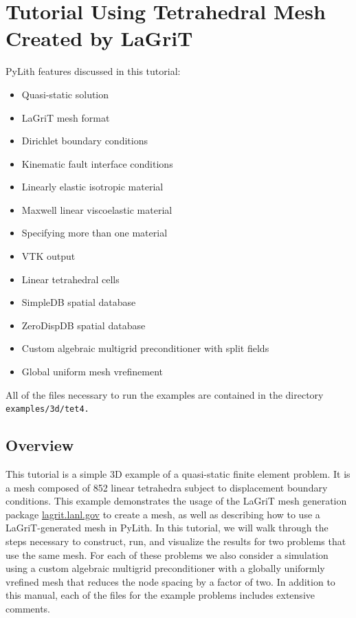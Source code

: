 
\section{\label{sec:Tutorial-3d-tet4}Tutorial Using Tetrahedral Mesh Created
by LaGriT}

PyLith features discussed in this tutorial:
\begin{itemize}
\item Quasi-static solution
\item LaGriT mesh format
\item Dirichlet boundary conditions
\item Kinematic fault interface conditions
\item Linearly elastic isotropic material
\item Maxwell linear viscoelastic material
\item Specifying more than one material
\item VTK output
\item Linear tetrahedral cells
\item SimpleDB spatial database
\item ZeroDispDB spatial database
\item Custom algebraic multigrid preconditioner with split fields
\item Global uniform mesh vrefinement
\end{itemize}
All of the files necessary to run the examples are contained in the
directory \texttt{examples/3d/tet4.}


\subsection{Overview}

This tutorial is a simple 3D example of a quasi-static finite element
problem. It is a mesh composed of 852 linear tetrahedra subject to
displacement boundary conditions. This example demonstrates the usage
of the LaGriT mesh generation package \url{lagrit.lanl.gov} to create
a mesh, as well as describing how to use a LaGriT-generated mesh in
PyLith. In this tutorial, we will walk through the steps necessary
to construct, run, and visualize the results for two problems that
use the same mesh. For each of these problems we also consider a simulation
using a custom algebraic multigrid preconditioner with a globally
uniformly vrefined mesh that reduces the node spacing by a factor of
two. In addition to this manual, each of the files for the example
problems includes extensive comments.


